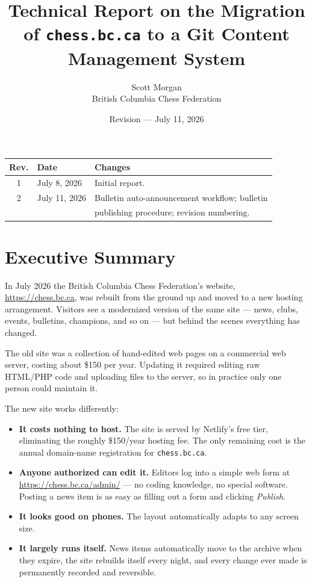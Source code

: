 \documentclass[12pt,letterpaper]{article}
\title{Technical Report on the Migration of \texttt{chess.bc.ca} to a Git
Content Management System}
\author{Scott Morgan \\ British Columbia Chess Federation}
\date{Revision \reportrevision{} --- July 11, 2026}
\begin{document}
\maketitle

\begin{center}
\small
\begin{tabular}{@{}cll@{}}
\toprule
\textbf{Rev.} & \textbf{Date} & \textbf{Changes} \\
\midrule
1 & July 8, 2026 & Initial report. \\
2 & July 11, 2026 & Bulletin auto-announcement workflow; bulletin \\
  &               & publishing procedure; revision numbering. \\
\bottomrule
\end{tabular}
\end{center}

\section*{Executive Summary}

In July 2026 the British Columbia Chess Federation's website,
\url{https://chess.bc.ca}, was rebuilt from the ground up and moved to a new
hosting arrangement. Visitors see a modernized version of the same site ---
news, clubs, events, bulletins, champions, and so on --- but behind the
scenes everything has changed.

The old site was a collection of hand-edited web pages on a commercial web
server, costing about \$150 per year. Updating it required editing raw
HTML/PHP code and uploading files to the server, so in practice only one
person could maintain it.

The new site works differently:

\begin{itemize}[nosep]
  \item \textbf{It costs nothing to host.} The site is served by Netlify's
        free tier, eliminating the roughly \$150/year hosting fee. The only
        remaining cost is the annual domain-name registration for
        \texttt{chess.bc.ca}.
  \item \textbf{Anyone authorized can edit it.} Editors log into a simple
        web form at \url{https://chess.bc.ca/admin/} --- no coding
        knowledge, no special software. Posting a news item is as easy as
        filling out a form and clicking \emph{Publish}.
  \item \textbf{It looks good on phones.} The layout automatically adapts
        to any screen size.
  \item \textbf{It largely runs itself.} News items automatically move to
        the archive when they expire, the site rebuilds itself every night,
        and every change ever made is permanently recorded and reversible.
\end{itemize}
\end{document}
